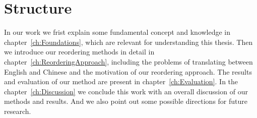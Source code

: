 \section{Structure}
\label{ch:Introduction:sec:Structure}

In our work we frist explain some fundamental concept and knowledge in chapter~\ref{ch:Foundations}, which are relevant for understanding this thesis. Then we introduce our reordering methods in detail in chapter~\ref{ch:ReorderingApproach}, including the problems of translating between English and Chinese and the motivation of our reordering approach. The results and evaluation of our method are present in chapter~\ref{ch:Evaluation}. In the chapter~\ref{ch:Discussion} we conclude this work with an overall discussion of our methods and results. And we also point out some possible directions for future research.